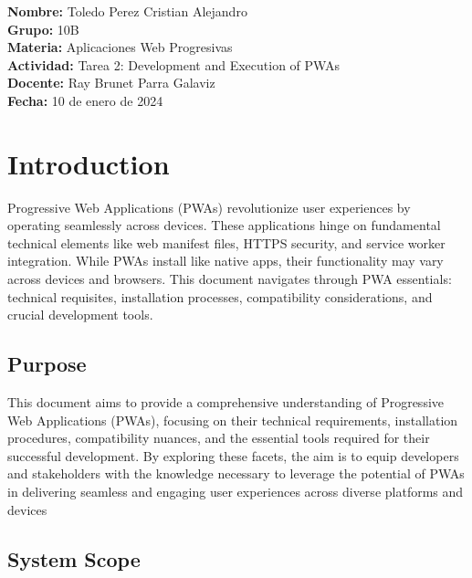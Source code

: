 \documentclass[12pt,a4paper, twosite]{article}
\date{}
\title{}
\begin{document}
\maketitle

\begin{center}
  \textbf{Nombre:} Toledo Perez Cristian Alejandro \\
  \textbf{Grupo:} 10B \\
  \textbf{Materia:} Aplicaciones Web Progresivas \\
  \textbf{Actividad:} Tarea 2: Development and Execution of PWAs \\
  \textbf{Docente:} Ray Brunet Parra Galaviz \\
  \textbf{Fecha:} 10 de enero de 2024
\end{center}

\newpage


\tableofcontents

\newpage

\section{Introduction}
\label{sec:org60390fa}

Progressive Web Applications (PWAs) revolutionize user 
experiences by operating seamlessly across devices.
These applications hinge on fundamental technical 
elements like web manifest files, HTTPS security, and 
service worker integration. While PWAs install like native 
apps, their functionality may vary across devices and browsers.
This document navigates through PWA essentials: technical requisites, 
installation processes, compatibility considerations, and crucial 
development tools.

\subsection{Purpose}
\label{sec:org434c3ef}

This document aims to provide a comprehensive understanding 
of Progressive Web Applications (PWAs), focusing on their 
technical requirements, installation procedures, compatibility 
nuances, and the essential tools required for their successful 
development. By exploring these facets, the aim is to equip developers 
and stakeholders with the knowledge necessary to leverage the potential
of PWAs in delivering seamless and engaging user experiences across 
diverse platforms and devices


\subsection{System Scope}
\label{sec:org12e44a1}
\end{document}
